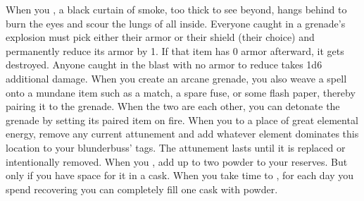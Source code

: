 \documentclass[darkmode]{dw_playbook}
\begin{document}
{{            \gapSm
            \gapSm
            \gapSm
            }
        \gap
            {When you , a black curtain of smoke, too thick to see beyond, hangs behind to burn the eyes and scour the lungs of all inside.}
        \gap
            {Everyone caught in a grenade’s explosion must pick either their armor or their shield (their choice) and permanently reduce its armor by 1.  If that item has 0 armor afterward, it gets destroyed.  Anyone caught in the blast with no armor to reduce takes 1d6 additional damage.}
        \gap
            {When you create an arcane grenade, you also weave a spell onto a mundane item such as a match, a spare fuse, or some flash paper, thereby pairing it to the grenade.  When the two are  each other, you can detonate the grenade by setting its paired item on fire.}
    }
    {
            {When you  to a place of great elemental energy, remove any current attunement and add whatever element dominates this location to your blunderbuss’ tags.  The attunement lasts until it is replaced or intentionally removed.}
            {When you , add up to two powder to your reserves.  But only if you have space for it in a cask.  When you take time to , for each day you spend recovering you can completely fill one cask with powder.}
    }

\clearpage
~
\end{document}

